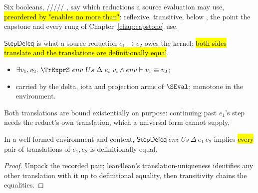 \begin{definition}
\label{def:SEvalFlags}
\leanok
{} Six booleans, /////
, say which reductions a source evaluation may use, \hl{preordered by "enables no more
than"}: reflexive, transitive,  below , the point the capstone and
every rung of Chapter~\ref{chap:capstone} use.
\end{definition}

\begin{definition}
\label{def:StepDefeq}
\leanok
{}
 $\mathsf{StepDefeq}$ is what a source reduction $e_1 \longrightarrow e_2$ owes the
kernel: \hl{both sides translate and the translations are definitionally equal}.
\begin{itemize}
\item $\exists v_1, v_2.\ \TrExprS\ env\ Us\ \Delta\ e_i\ v_i \wedge env \vdash v_1 \equiv v_2$;
\item carried by the delta, iota and projection arms of $\SEval$; monotone in the environment.
\end{itemize}
 Both translations are bound existentially on purpose: continuing past $e_1$'s step
needs the reduct's own translation, which a universal form cannot supply.
\end{definition}

\begin{lemma}
\label{lem:StepDefeq-uniq_form}
\leanok
{}
 In a well-formed environment and context, $\mathsf{StepDefeq}\ env\ Us\ \Delta\
e_1\ e_2$ implies \hl{every} pair of translations of $e_1, e_2$ is definitionally equal.
\end{lemma}
\begin{proof}
\leanok
{}
 Unpack the recorded pair; lean4lean's translation-uniqueness identifies any other
translation with it up to definitional equality, then transitivity chains the equalities.
\end{proof}

